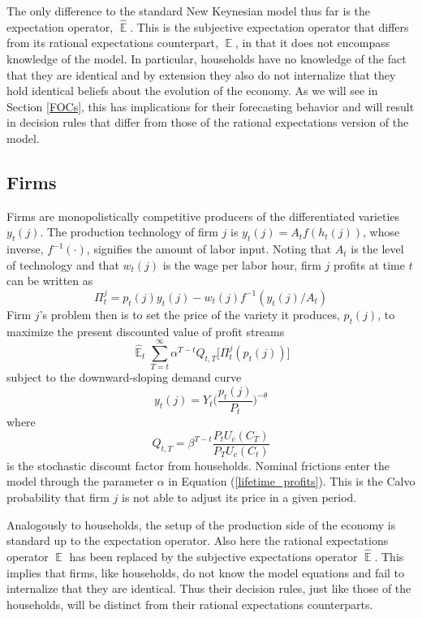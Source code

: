 \documentclass[11pt]{article}
\renewcommand{\[}{\begin{equation}}
\renewcommand{\]}{\end{equation}}
\DeclareMathOperator{\E}{\mathbb{E}}
\begin{document}
The only difference to the standard New Keynesian model thus far is the expectation operator, $\hat{\E}$. This is the subjective expectation operator that differs from its rational expectations counterpart, $\E$, in that it does not encompass knowledge of the model. In particular, households have no knowledge of the fact that they are identical and by extension they also do not internalize that they hold identical beliefs about the evolution of the economy. As we will see in Section \ref{FOCs}, this has implications for their forecasting behavior and will result in decision rules that differ from those of the rational expectations version of the model.

\subsection{Firms}

Firms are monopolistically competitive producers of the differentiated varieties $y_t(j)$. The production technology of firm $j$ is $y_t(j)=A_tf(h_t(j))$, whose inverse, $f^{-1}(\cdot)$, signifies the amount of labor input. Noting that $A_t$ is the level of technology and that $w_t(j)$ is the wage per labor hour, firm $j$ profits at time $t$ can be written as
\begin{equation}
\Pi_t^j = p_t(j)y_t(j) -w_t(j)f^{-1}(y_t(j)/A_t)
\end{equation}
Firm $j$'s problem then is to set the price of the variety it produces, $p_t(j)$, to maximize the present discounted value of profit streams
\begin{equation}
\hat{\E}_t\sum^{\infty}_{T=t}\alpha^{T-t} Q_{t,T} \bigg[ \Pi^j_t(p_t(j))\bigg]
\label{lifetime_profits}
\end{equation}
subject to the downward-sloping demand curve
\begin{equation}
y_t(j) = Y_t \bigg(\frac{p_t(j)}{P_t}\bigg)^{-\theta}
\end{equation}
where 
\begin{equation}
Q_{t,T} = \beta^{T-t} \frac{P_t U_c(C_T)}{P_T U_c(C_t)}
\end{equation}
is the stochastic discount factor from households. Nominal frictions enter the model through the parameter $\alpha$ in Equation (\ref{lifetime_profits}). This is the Calvo probability that firm $j$ is not able to adjust its price in a given period. 

Analogously to households, the setup of the production side of the economy is standard up to the expectation operator. Also here the rational expectations operator $\E$ has been replaced by the subjective expectations operator $\hat{\E}$. This implies that firms, like households, do not know the model equations and fail to internalize that they are identical. Thus their decision rules, just like those of the households, will be distinct from their rational expectations counterparts. 
\end{document}
